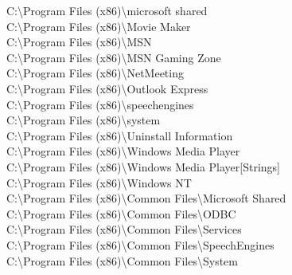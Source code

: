 C:\textbackslash Program Files (x86)\textbackslash microsoft shared \\
C:\textbackslash Program Files (x86)\textbackslash Movie Maker \\
C:\textbackslash Program Files (x86)\textbackslash MSN \\
C:\textbackslash Program Files (x86)\textbackslash MSN Gaming Zone \\
C:\textbackslash Program Files (x86)\textbackslash NetMeeting \\
C:\textbackslash Program Files (x86)\textbackslash Outlook Express \\
C:\textbackslash Program Files (x86)\textbackslash speechengines \\
C:\textbackslash Program Files (x86)\textbackslash system \\
C:\textbackslash Program Files (x86)\textbackslash Uninstall Information \\
C:\textbackslash Program Files (x86)\textbackslash Windows Media Player \\
C:\textbackslash Program Files (x86)\textbackslash Windows Media Player[Strings] \\
C:\textbackslash Program Files (x86)\textbackslash Windows NT \\
C:\textbackslash Program Files (x86)\textbackslash Common Files\textbackslash Microsoft Shared \\
C:\textbackslash Program Files (x86)\textbackslash Common Files\textbackslash ODBC \\
C:\textbackslash Program Files (x86)\textbackslash Common Files\textbackslash Services \\
C:\textbackslash Program Files (x86)\textbackslash Common Files\textbackslash SpeechEngines \\
C:\textbackslash Program Files (x86)\textbackslash Common Files\textbackslash System \\
